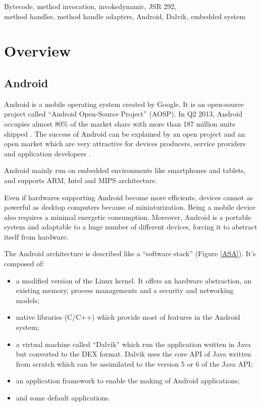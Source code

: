 \documentclass{sig-alternate}
\def \DALVIK{Dalvik\xspace}
\def \ANDROID{Android\xspace}
\def \DEX{DEX\xspace}
\begin{document}


\keywords
Bytecode, method invocation, invokedynamic, JSR 292,\\
method handles, method handle adapters, Android, Dalvik, embedded system

\newpage
\section{Overview}

  \subsection{Android}

    \ANDROID is a mobile operating system created by Google.
    It is an open-source project called ``\ANDROID Open-Source Project'' (AOSP).
    In Q2 2013, \ANDROID occupies almost 80\% of the market share with more than 187 million units shipped \cite{idc-website}.
    The success of \ANDROID can be explained by an open project and an open market
    which are very attractive for devices producers, service providers and application developers \cite{ieee-butler-android-landscape}\cite{ieee-paulson-shift-dynamic-languages}.

    \ANDROID mainly run on embedded environments like smartphones and tablets,
    and supports ARM, Intel and MIPS architecture.
    
    Even if hardwares supporting \ANDROID become more efficients,
    devices cannot as powerful as desktop computers because of miniaturization.
    Being a mobile device also requires a minimal energetic consumption.
    Moreover, \ANDROID is a portable system and adaptable to a huge number of different devices,
    forcing it to abstract itself from hardware.

    The \ANDROID architecture is described like a ``software stack'' (Figure \ref{ASA}).
    It's composed of:
    \begin{itemize}
      \item a modified version of the Linux kernel.
        It offers an hardware abstraction, an existing memory, process managements and a security and networking models;
      \item native libraries (C/C++)
        which provide most of features in the \ANDROID system;
      \item a virtual machine called ``\DALVIK''
        which run the application written in Java but converted to the \DEX format.
        \DALVIK uses the core API of Java written from scratch
        which can be assimilated to the version 5 or 6 of the Java API;
      \item an application framework to enable the making of \ANDROID applications;
      \item and some default applications.
    \end{itemize}
\end{document}
